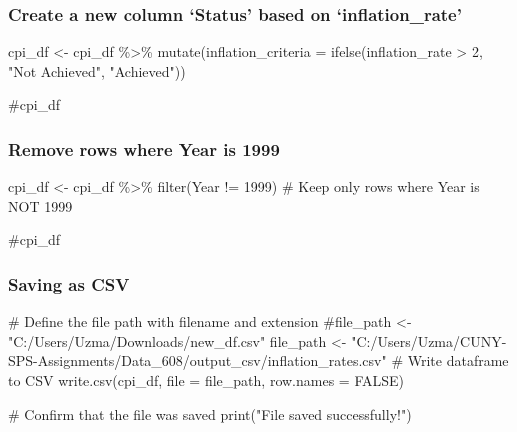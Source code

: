 \documentclass[
  letterpaper,
  DIV=11,
  numbers=noendperiod]{scrartcl}
\newenvironment{Shaded}{\begin{snugshade}}{\end{snugshade}}
\newcommand{\AttributeTok}[1]{\textcolor[rgb]{0.40,0.45,0.13}{#1}}
\newcommand{\CommentTok}[1]{\textcolor[rgb]{0.37,0.37,0.37}{#1}}
\newcommand{\ConstantTok}[1]{\textcolor[rgb]{0.56,0.35,0.01}{#1}}
\newcommand{\DecValTok}[1]{\textcolor[rgb]{0.68,0.00,0.00}{#1}}
\newcommand{\FunctionTok}[1]{\textcolor[rgb]{0.28,0.35,0.67}{#1}}
\newcommand{\NormalTok}[1]{\textcolor[rgb]{0.00,0.23,0.31}{#1}}
\newcommand{\OtherTok}[1]{\textcolor[rgb]{0.00,0.23,0.31}{#1}}
\newcommand{\SpecialCharTok}[1]{\textcolor[rgb]{0.37,0.37,0.37}{#1}}
\newcommand{\StringTok}[1]{\textcolor[rgb]{0.13,0.47,0.30}{#1}}
\begin{document}
\subsubsection{Create a new column `Status' based on
`inflation\_rate'}\label{create-a-new-column-status-based-on-inflation_rate}

\begin{Shaded}
\begin{Highlighting}[]
\NormalTok{cpi\_df }\OtherTok{\textless{}{-}}\NormalTok{ cpi\_df }\SpecialCharTok{\%\textgreater{}\%}
  \FunctionTok{mutate}\NormalTok{(}\AttributeTok{inflation\_criteria =} \FunctionTok{ifelse}\NormalTok{(inflation\_rate }\SpecialCharTok{\textgreater{}} \DecValTok{2}\NormalTok{, }\StringTok{"Not Achieved"}\NormalTok{, }\StringTok{"Achieved"}\NormalTok{))}

\CommentTok{\#cpi\_df}
\end{Highlighting}
\end{Shaded}

\subsubsection{Remove rows where Year is
1999}\label{remove-rows-where-year-is-1999}

\begin{Shaded}
\begin{Highlighting}[]
\NormalTok{cpi\_df }\OtherTok{\textless{}{-}}\NormalTok{ cpi\_df }\SpecialCharTok{\%\textgreater{}\%}
  \FunctionTok{filter}\NormalTok{(Year }\SpecialCharTok{!=} \DecValTok{1999}\NormalTok{)  }\CommentTok{\# Keep only rows where Year is NOT 1999}

\CommentTok{\#cpi\_df}
\end{Highlighting}
\end{Shaded}

\subsubsection{Saving as CSV}\label{saving-as-csv-1}

\begin{Shaded}
\begin{Highlighting}[]
\CommentTok{\# Define the file path with filename and extension}
\CommentTok{\#file\_path \textless{}{-} "C:/Users/Uzma/Downloads/new\_df.csv"}
\NormalTok{file\_path }\OtherTok{\textless{}{-}} \StringTok{"C:/Users/Uzma/CUNY{-}SPS{-}Assignments/Data\_608/output\_csv/inflation\_rates.csv"}
\CommentTok{\# Write dataframe to CSV}
\FunctionTok{write.csv}\NormalTok{(cpi\_df, }\AttributeTok{file =}\NormalTok{ file\_path, }\AttributeTok{row.names =} \ConstantTok{FALSE}\NormalTok{)}

\CommentTok{\# Confirm that the file was saved}
\FunctionTok{print}\NormalTok{(}\StringTok{"File saved successfully!"}\NormalTok{)}
\end{Highlighting}
\end{Shaded}
\end{document}
